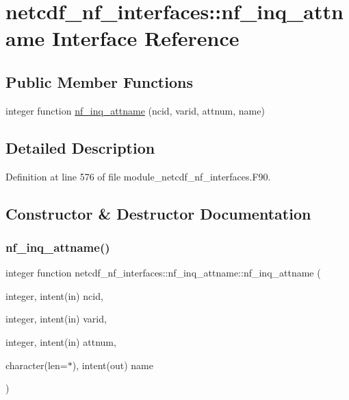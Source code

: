 \hypertarget{interfacenetcdf__nf__interfaces_1_1nf__inq__attname}{}\section{netcdf\+\_\+nf\+\_\+interfaces\+:\+:nf\+\_\+inq\+\_\+attname Interface Reference}
\label{interfacenetcdf__nf__interfaces_1_1nf__inq__attname}
\subsection*{Public Member Functions}
\begin{DoxyCompactItemize}
\item 
integer function \hyperlink{interfacenetcdf__nf__interfaces_1_1nf__inq__attname_ac58e88ae38b23a33fb0eb52c63fd93c1}{nf\+\_\+inq\+\_\+attname} (ncid, varid, attnum, name)
\end{DoxyCompactItemize}


\subsection{Detailed Description}


Definition at line 576 of file module\+\_\+netcdf\+\_\+nf\+\_\+interfaces.\+F90.



\subsection{Constructor \& Destructor Documentation}
\mbox{\label{interfacenetcdf__nf__interfaces_1_1nf__inq__attname_ac58e88ae38b23a33fb0eb52c63fd93c1}} 
\subsubsection{\texorpdfstring{nf\+\_\+inq\+\_\+attname()}{nf\_inq\_attname()}}
{\footnotesize\ttfamily integer function netcdf\+\_\+nf\+\_\+interfaces\+::nf\+\_\+inq\+\_\+attname\+::nf\+\_\+inq\+\_\+attname (\begin{DoxyParamCaption}\item[{integer, intent(in)}]{ncid,  }\item[{integer, intent(in)}]{varid,  }\item[{integer, intent(in)}]{attnum,  }\item[{character(len=$\ast$), intent(out)}]{name }\end{DoxyParamCaption})}



